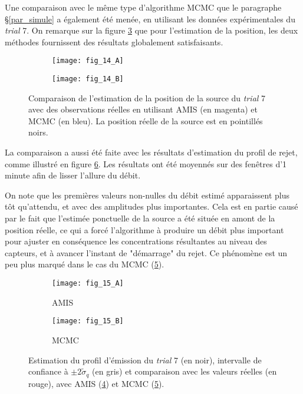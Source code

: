 {Une comparaison avec le même type d'algorithme MCMC que le paragraphe §\ref{par_simule} a également été menée, en utilisant les données expérimentales du \textit{trial} 7. On remarque sur la figure \ref{fig_14_AE} que pour l'estimation de la position, les deux méthodes fournissent des résultats globalement satisfaisants. \\

\begin{figure}[h!]
	\centering
	\begin{subfigure}[t]{0.5\textwidth}
		\centering
		\texttt{[image: fig\_14\_A]}
		\caption{}
		\label{fig_14_A}
	\end{subfigure}%
	\centering
	\begin{subfigure}[t]{0.5\textwidth}
		\centering
		\texttt{[image: fig\_14\_B]}
		\caption{}
		\label{fig_14_B}
	\end{subfigure}
	\caption{Comparaison de l'estimation de la position de la source du \textit{trial} 7 avec des observations réelles en utilisant AMIS (en magenta) et MCMC (en bleu). La position réelle de la source est en pointillés noirs.}
	\label{fig_14_AE} 
\end{figure}

La comparaison a aussi été faite avec les résultats d'estimation du profil de rejet, comme illustré en figure \ref{fig_15_AE}. Les résultats ont été moyennés sur des fenêtres d'1 minute afin de lisser l'allure du débit.

 On note que les premières valeurs non-nulles du débit estimé apparaissent plus tôt qu'attendu, et avec des amplitudes plus importantes. Cela est en partie causé par le fait que l'estimée ponctuelle de la source a été située  en amont de la position réelle, ce qui a forcé l'algorithme à produire un débit plus important pour ajuster en conséquence les concentrations résultantes au niveau des capteurs, et à avancer l'instant de "démarrage" du rejet. Ce phénomène est un peu plus marqué dans le cas du MCMC (\ref{fig_15_B}).

\begin{figure}[h!]
	\centering
	\begin{subfigure}[t]{0.5\textwidth}
		\centering
		\texttt{[image: fig\_15\_A]}
		\caption{AMIS}
		\label{fig_15_A}
	\end{subfigure}%
	\centering
	\begin{subfigure}[t]{0.5\textwidth}
		\centering
		\texttt{[image: fig\_15\_B]}
		\caption{MCMC}
		\label{fig_15_B}
	\end{subfigure}
	\caption{Estimation du profil d'émission du \textit{trial} 7 (en noir), intervalle de confiance à $\pm 2\widetilde{\sigma}_q$ (en gris) et comparaison avec les valeurs réelles (en rouge), avec AMIS (\ref{fig_15_A}) et MCMC (\ref{fig_15_B}).}
	\label{fig_15_AE} 
\end{figure}

}
